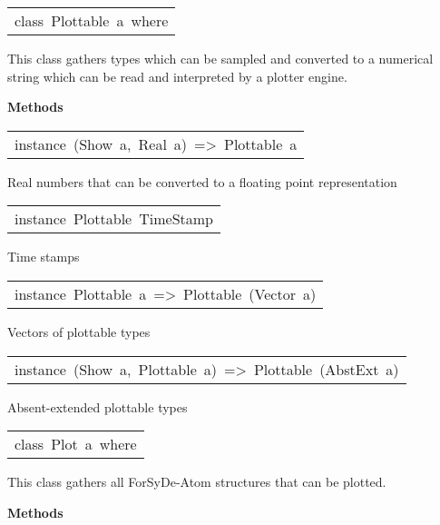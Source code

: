 \begin{haddockdesc}
\item[\begin{tabular}{@{}l}
class\ Plottable\ a\ where
\end{tabular}]\haddockbegindoc
This class gathers types which can be sampled and converted to a
 numerical string which can be read and interpreted by a plotter
 engine.\par

\haddockpremethods{}\textbf{Methods}
\end{haddockdesc}
\begin{haddockdesc}
\item[\begin{tabular}{@{}l}
instance\ (Show\ a,\ Real\ a)\ =>\ Plottable\ a
\end{tabular}]\haddockbegindoc
Real numbers that can be converted to a floating point representation\par

\end{haddockdesc}
\begin{haddockdesc}
\item[\begin{tabular}{@{}l}
instance\ Plottable\ TimeStamp
\end{tabular}]\haddockbegindoc
Time stamps\par

\end{haddockdesc}
\begin{haddockdesc}
\item[\begin{tabular}{@{}l}
instance\ Plottable\ a\ =>\ Plottable\ (Vector\ a)
\end{tabular}]\haddockbegindoc
Vectors of plottable types\par

\end{haddockdesc}
\begin{haddockdesc}
\item[\begin{tabular}{@{}l}
instance\ (Show\ a,\ Plottable\ a)\ =>\ Plottable\ (AbstExt\ a)
\end{tabular}]\haddockbegindoc
Absent-extended plottable types\par

\end{haddockdesc}
\begin{haddockdesc}
\item[\begin{tabular}{@{}l}
class\ Plot\ a\ where
\end{tabular}]\haddockbegindoc
This class gathers all ForSyDe-Atom structures that can be
 plotted.\par

\haddockpremethods{}\textbf{Methods}
\end{haddockdesc}
